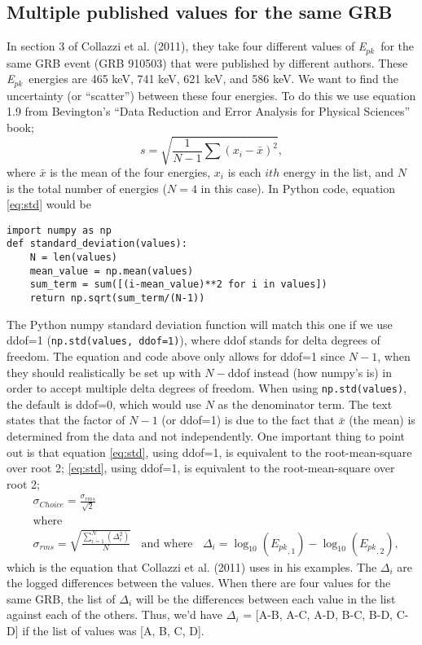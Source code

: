 \documentclass[11pt, oneside]{article}   	%
\newcommand{\epeak}{\textit{E$_{pk}$}}
\newcommand{\code}[1]{\texttt{#1}}  %
\begin{document}
\subsection{Multiple published values for the same GRB}
In section 3 of Collazzi et al. (2011), they take four different values of \epeak \ for the same GRB event (GRB 910503) that were published by different authors. These \epeak \ energies are 465 keV, 741 keV, 621 keV, and 586 keV. We want to find the uncertainty (or ``scatter'') between these four energies. To do this we use equation 1.9 from Bevington's ``Data Reduction and Error Analysis for Physical Sciences'' book;
\begin{equation}\label{eq:std}
s = \sqrt{\frac{1}{N-1} \sum (x_i - \bar{x})^2 } ,
\end{equation}
where $\bar{x}$ is the mean of the four energies, $x_i$ is each $ith$ energy in the list, and $N$ is the total number of energies ($N=4$ in this case). In Python code, equation \ref{eq:std} would be 
\lstset{language=Python}
\begin{lstlisting}
import numpy as np
def standard_deviation(values):
    N = len(values)
    mean_value = np.mean(values)
    sum_term = sum([(i-mean_value)**2 for i in values])
    return np.sqrt(sum_term/(N-1))
\end{lstlisting}
The Python numpy standard deviation function will match this one if we use ddof=1 (\code{np.std(values, ddof=1)}), where ddof stands for delta degrees of freedom. The equation and code above only allows for ddof=1 since $N-1$, when they should realistically be set up with $N-${ddof} instead (how numpy's is) in order to accept multiple delta degrees of freedom. When using \code{np.std(values)}, the default is ddof=0, which would use $N$ as the denominator term.  
The text states that the factor of $N-1$ (or ddof=1) is due to the fact that $\bar{x}$ (the mean) is determined from the data and not independently. One important thing to point out is that equation \ref{eq:std}, using ddof=1, is equivalent to the root-mean-square over root 2; 
\ref{eq:std}, using ddof=1, is equivalent to the root-mean-square over root 2; 
\begin{equation}
\begin{split}
& \sigma_{Choice} = \frac{\sigma_{rms}}{\sqrt{2}} \\
& \text{where} \\ 
& \sigma_{rms} = \sqrt{\frac{\sum^N_{i=1} (\Delta_i^2)}{N}} \ \ \ \  \text{and where} \ \ \ \  \Delta_i = \log_{10}(\epeak_{, 1}) - \log_{10}(\epeak_{, 2}) , 
\end{split}
\end{equation}
which is the equation that Collazzi et al. (2011) uses in his examples. The $\Delta_i$ are the logged differences between the values. When there are four values for the same GRB, the list of $\Delta_i$ will be the differences between each value in the list against each of the others. Thus, we'd have $\Delta_i$ = [A-B, A-C, A-D, B-C, B-D, C-D] if the list of values was [A, B, C, D]. 
\end{document}
